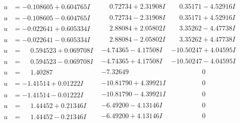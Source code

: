 \documentclass[1p]{elsarticle_modified}
\theoremstyle{definition}
\begin{document}
$$\begin{array}{c|c|c}
\begin{aligned}
u &= -0.108605 + 0.604765 I\end{aligned}
 & \phantom{-}0.72734 + 2.31908 I & \phantom{-}0.35171 - 4.52916 I \\ \hline\begin{aligned}
u &= -0.108605 - 0.604765 I\end{aligned}
 & \phantom{-}0.72734 - 2.31908 I & \phantom{-}0.35171 + 4.52916 I \\ \hline\begin{aligned}
u &= -0.022641 + 0.605334 I\end{aligned}
 & \phantom{-}2.88084 + 2.05802 I & \phantom{-}3.35262 - 4.47738 I \\ \hline\begin{aligned}
u &= -0.022641 - 0.605334 I\end{aligned}
 & \phantom{-}2.88084 - 2.05802 I & \phantom{-}3.35262 + 4.47738 I \\ \hline\begin{aligned}
u &= \phantom{-}0.594523 + 0.069708 I\end{aligned}
 & -4.74365 - 4.17508 I & -10.50247 + 4.04595 I \\ \hline\begin{aligned}
u &= \phantom{-}0.594523 - 0.069708 I\end{aligned}
 & -4.74365 + 4.17508 I & -10.50247 - 4.04595 I \\ \hline\begin{aligned}
u &= \phantom{-}1.40287\phantom{ +0.000000I}\end{aligned}
 & -7.32649\phantom{ +0.000000I} & \phantom{-0.000000 } 0 \\ \hline\begin{aligned}
u &= -1.41514 + 0.01222 I\end{aligned}
 & -10.81790 + 4.39921 I & \phantom{-0.000000 } 0 \\ \hline\begin{aligned}
u &= -1.41514 - 0.01222 I\end{aligned}
 & -10.81790 - 4.39921 I & \phantom{-0.000000 } 0 \\ \hline\begin{aligned}
u &= \phantom{-}1.44452 + 0.21346 I\end{aligned}
 & -6.49200 - 4.13146 I & \phantom{-0.000000 } 0 \\ \hline\begin{aligned}
u &= \phantom{-}1.44452 - 0.21346 I\end{aligned}
 & -6.49200 + 4.13146 I & \phantom{-0.000000 } 0 \\ \hline\begin{aligned}

\end{aligned}
\end{array}$$
\end{document}
